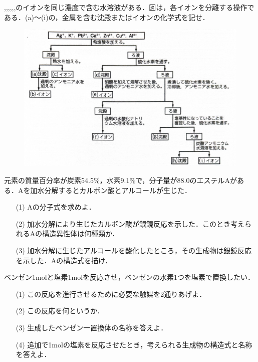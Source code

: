 \documentclass[a4paper,11pt]{ltjsarticle}
\title{}
\author{}
\date{}
\begin{document}
\begin{que}
,,,,,,のイオンを同じ濃度で含む水溶液がある．図は，各イオンを分離する操作である．(a)〜(i)の，金属を含む沈殿またはイオンの化学式を記せ．
\begin{figure}[H]
\centering
\includegraphics[width=13cm]{269.pdf}
\end{figure}
\end{que}
\newpage
\begin{que}
元素の質量百分率が炭素54.5$\%$，水素9.1$\%$で，分子量が88.0のエステルAがある．Aを加水分解するとカルボン酸とアルコールが生じた．
\begin{itemize}
    \item[(1)]Aの分子式を求めよ．
    \item [(2)]加水分解により生じたカルボン酸が銀鏡反応を示した．このとき考えられるAの構造異性体は何種類か．
    \item [(3)]加水分解に生じたアルコールを酸化したところ，その生成物は銀鏡反応を示した．Aの構造式を描け．
\end{itemize}
\end{que}
\newpage
  \begin{que}
    ベンゼン1molと塩素1molを反応させ，ベンゼンの水素1つを塩素で置換したい．
    \begin{itemize}
        \item [(1)]この反応を進行させるために必要な触媒を2通りあげよ．
        \item [(2)]この反応を何というか．
        \item [(3)]生成したベンゼン一置換体の名称を答えよ．
        \item [(4)]追加で1molの塩素を反応させたとき，考えられる生成物の構造式と名称を答えよ．
  \end{itemize}
    \end{que}
\end{document}
